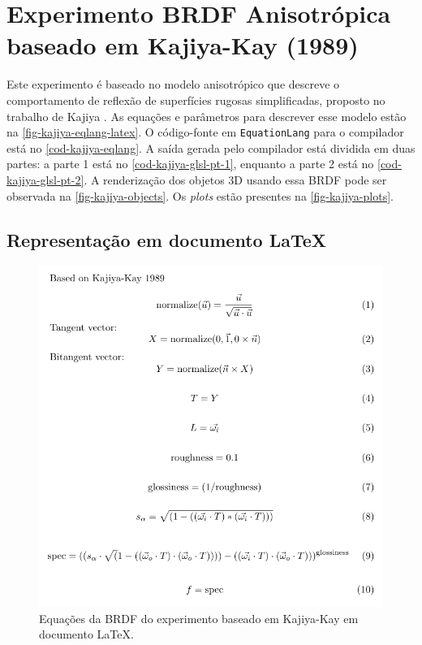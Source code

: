 

\section{Experimento BRDF Anisotrópica baseado em Kajiya-Kay (1989)}
\label{section-experiment-kajiya}

Este experimento é baseado no modelo anisotrópico que descreve o comportamento de reflexão de superfícies rugosas simplificadas, proposto no trabalho de Kajiya \cite{kajiya1985anisotropic}. As equações e parâmetros para descrever esse modelo estão na \autoref{fig-kajiya-eqlang-latex}. O código-fonte em \texttt{EquationLang} para o compilador está no \autoref{cod-kajiya-eqlang}. A saída gerada pelo compilador está dividida em duas partes: a parte 1 está no \autoref{cod-kajiya-glsl-pt-1}, enquanto a parte 2 está no \autoref{cod-kajiya-glsl-pt-2}. A renderização dos objetos 3D usando essa BRDF pode ser observada na \autoref{fig-kajiya-objects}. Os \textit{plots} estão presentes na \autoref{fig-kajiya-plots}.

\subsection{Representação em documento \LaTeX{}}
\begin{figure}[H]
    \caption{\label{fig-kajiya-eqlang-latex} \small Equações da BRDF do experimento baseado em Kajiya-Kay em documento \LaTeX{}.}
    \begin{center}
        \includegraphics[scale=0.92]{./Imagens/brdfs/aniso.pdf}
    \end{center}
\end{figure}


